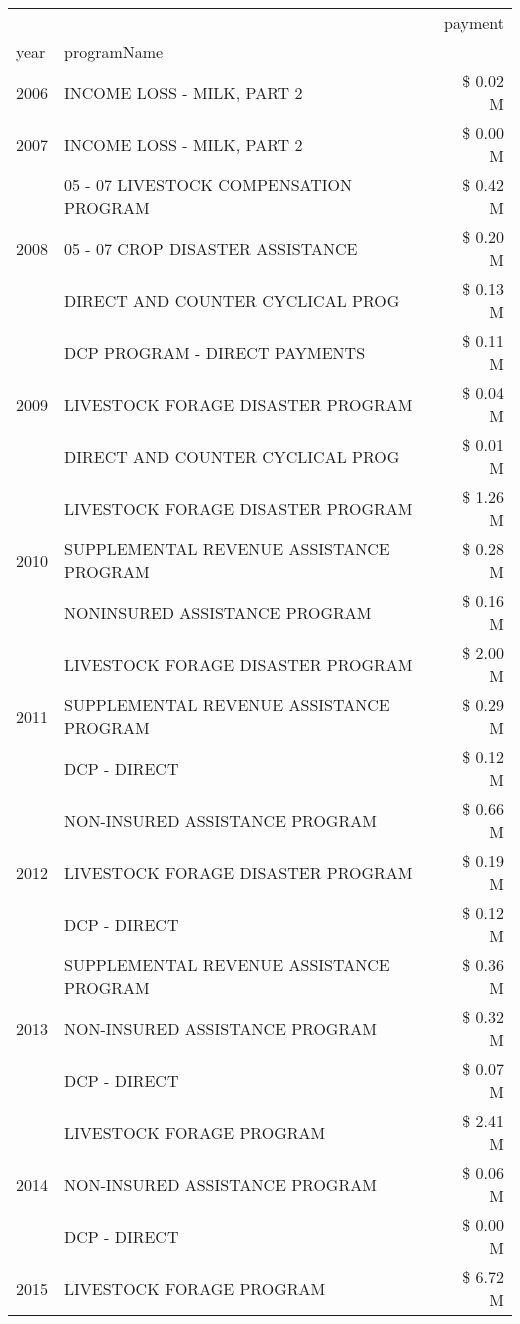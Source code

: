 \begin{tabular}{llr}
\toprule
 &  & payment \\
year & programName &  \\
\midrule
2006 & INCOME LOSS - MILK, PART 2 & \$ 0.02 M \\
\cline{1-3}
2007 & INCOME LOSS - MILK, PART 2 & \$ 0.00 M \\
\cline{1-3}
\multirow[t]{3}{*}{2008} & 05 - 07 LIVESTOCK COMPENSATION PROGRAM & \$ 0.42 M \\
 & 05 - 07 CROP DISASTER ASSISTANCE & \$ 0.20 M \\
 & DIRECT AND COUNTER CYCLICAL PROG & \$ 0.13 M \\
\cline{1-3}
\multirow[t]{3}{*}{2009} & DCP PROGRAM - DIRECT PAYMENTS & \$ 0.11 M \\
 & LIVESTOCK FORAGE DISASTER  PROGRAM & \$ 0.04 M \\
 & DIRECT AND COUNTER CYCLICAL PROG & \$ 0.01 M \\
\cline{1-3}
\multirow[t]{3}{*}{2010} & LIVESTOCK FORAGE DISASTER PROGRAM & \$ 1.26 M \\
 & SUPPLEMENTAL REVENUE ASSISTANCE PROGRAM & \$ 0.28 M \\
 & NONINSURED ASSISTANCE PROGRAM & \$ 0.16 M \\
\cline{1-3}
\multirow[t]{3}{*}{2011} & LIVESTOCK FORAGE DISASTER PROGRAM & \$ 2.00 M \\
 & SUPPLEMENTAL REVENUE ASSISTANCE PROGRAM & \$ 0.29 M \\
 & DCP - DIRECT & \$ 0.12 M \\
\cline{1-3}
\multirow[t]{3}{*}{2012} & NON-INSURED ASSISTANCE PROGRAM & \$ 0.66 M \\
 & LIVESTOCK FORAGE DISASTER PROGRAM & \$ 0.19 M \\
 & DCP - DIRECT & \$ 0.12 M \\
\cline{1-3}
\multirow[t]{3}{*}{2013} & SUPPLEMENTAL REVENUE ASSISTANCE PROGRAM & \$ 0.36 M \\
 & NON-INSURED ASSISTANCE PROGRAM & \$ 0.32 M \\
 & DCP - DIRECT & \$ 0.07 M \\
\cline{1-3}
\multirow[t]{3}{*}{2014} & LIVESTOCK FORAGE PROGRAM & \$ 2.41 M \\
 & NON-INSURED ASSISTANCE PROGRAM & \$ 0.06 M \\
 & DCP - DIRECT & \$ 0.00 M \\
\cline{1-3}
\multirow[t]{3}{*}{2015} & LIVESTOCK FORAGE PROGRAM & \$ 6.72 M \\

\end{tabular}
